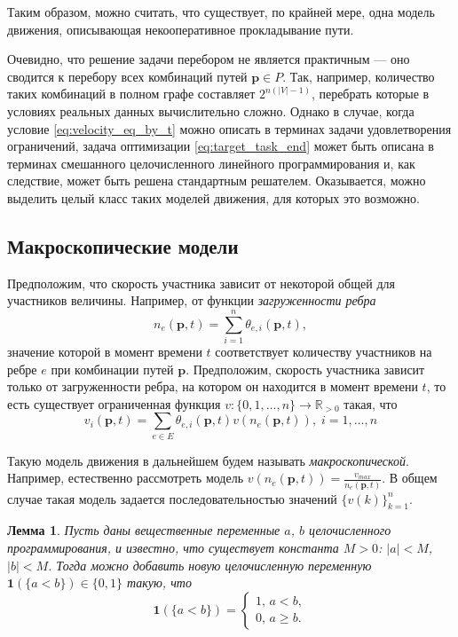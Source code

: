 \documentclass[12pt, a4paper]{article}
\newtheorem{lemma}{Лемма}[section]
\begin{document}
Таким образом, можно считать, что существует, по крайней мере, одна модель движения, описывающая некооперативное прокладывание пути.

Очевидно, что решение задачи перебором не является практичным --- оно сводится к перебору всех комбинаций путей $\textbf{p} \in P$. Так, например, количество таких комбинаций в полном графе составляет $2^{n (|V| - 1)}$, перебрать которые в условиях реальных данных вычислительно сложно.
Однако в случае, когда условие \eqref{eq:velocity_eq_by_t} можно описать в терминах задачи удовлетворения ограничений, задача оптимизации \eqref{eq:target_task_end} может быть описана в терминах смешанного целочисленного линейного программирования и, как следствие, может быть решена стандартным решателем. Оказывается, можно выделить целый класс таких моделей движения, для которых это возможно.

\subsection{Макроскопические модели}

Предположим, что скорость участника зависит от некоторой общей для участников величины. Например, от функции \textit{загруженности ребра}
$$ n_{e}(\textbf{p}, t) = \sum\limits_{i = 1}^n\theta_{e, i}(\textbf{p}, t),$$
значение которой в момент времени $t$ соответствует количеству участников на ребре $e$ при комбинации путей $\textbf{p}$. Предположим, скорость участника зависит только от загруженности ребра, на котором он находится в момент времени $t$, то есть существует ограниченная функция $v : \{0, 1, \dots, n\} \rightarrow \mathbb{R}_{> 0}$ такая, что
\begin{equation}
	\label{eq:velocity_eq_macro}
	 v_i(\textbf{p}, t) = \sum \limits _{e \in E} \theta_{e, i} (\textbf{p}, t) v (n_e (\textbf{p}, t)), \; i = 1, \dots, n
\end{equation}

Такую модель движения в дальнейшем будем называть \textit{макроскопической}.
Например, естественно рассмотреть модель $ v (n_e (\textbf{p}, t)) = \frac{v_{max}}{n_e (\textbf{p}, t)}$. В общем случае такая модель задается последовательностью значений  $\{v(k)\}_{k = 1}^n$.

\begin{lemma}
	\label{lemma:lt}
	Пусть даны вещественные переменные $a$, $b$ целочисленного программирования, и известно, что существует константа $M > 0$: $|a| < M$, $|b| < M$. Тогда можно добавить новую целочисленную переменную $\textbf{1} (\{a < b\}) \in \{0, 1\}$ такую, что
	\begin{equation*}
		\textbf{1} (\{a < b\}) = 
		\begin{cases}
			1,\, a < b,
			\\
			0,\, a \ge b.
		\end{cases}
	\end{equation*}

\end{lemma}
\end{document}
